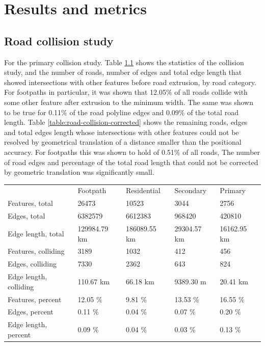 \documentclass{kththesis}
\begin{document}
\chapter{Results and metrics}

\section{Road collision study}

For the primary collision study.
Table \ref{table:road-collision} shows the statistics of the collision study, and the number of roads, number of edges and total edge length that showed intersections with other features before road extrusion, by road category.
For footpaths in particular, it was shown that 12.05\% of all roads collide with some other feature after extrusion to the minimum width.
The same was shown to be true for 0.11\% of the road polyline edges and 0.09\% of the total road length.
Table \ref{table:road-collision-corrected} shows the remaining roads, edges and total edges length whose intersections with other features could not be resolved by geometrical translation of a distance smaller than the positional accuracy.
For footpaths this was shown to hold of 0.51\% of all roads, 
The number of road edges and percentage of the total road length that could not be corrected by geometric translation was significantly small.

\begin{table}[H]
    \begin{tabular}{lllll}
                                & Footpath      & Residential  & Secondary   & Primary     \\
        Features, total         & 26473         & 10523        & 3044        & 2756        \\
        Edges, total            & 6382579       & 6612383      & 968420      & 420810      \\
        Edge length, total      & 129984.79 km  & 186089.55 km & 29304.57 km & 16162.95 km \\
        Features, colliding     & 3189          & 1032         & 412         & 456         \\
        Edges, colliding        & 7330          & 2362         & 643         & 824         \\
        Edge length, colliding  & 110.67 km     & 66.18 km     & 9389.30 m   & 20.41 km    \\
        Features, percent       & 12.05 \%      & 9.81 \%      & 13.53 \%    & 16.55 \%    \\
        Edges, percent          & 0.11 \%       & 0.04 \%      & 0.07 \%     & 0.20 \%     \\
        Edge length, percent    & 0.09 \%       & 0.04 \%      & 0.03 \%     & 0.13 \%

    \end{tabular}
    \label{table:road-collision}
\end{table}
\end{document}
